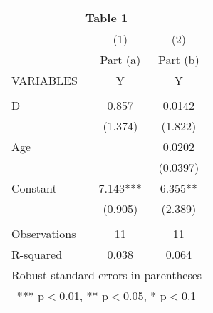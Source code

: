 \documentclass[]{article}
\begin{document}
\begin{tabular}{lcc}
\multicolumn{3}{c}{Table 1} \\ \hline
 & (1) & (2) \\
 & Part (a) & Part (b) \\
VARIABLES & Y & Y \\ \hline
 &  &  \\
D & 0.857 & 0.0142 \\
 & (1.374) & (1.822) \\
Age &  & 0.0202 \\
 &  & (0.0397) \\
Constant & 7.143*** & 6.355** \\
 & (0.905) & (2.389) \\
 &  &  \\
Observations & 11 & 11 \\
 R-squared & 0.038 & 0.064 \\ \hline
\multicolumn{3}{c}{ Robust standard errors in parentheses} \\
\multicolumn{3}{c}{ *** p$<$0.01, ** p$<$0.05, * p$<$0.1} \\
\end{tabular}
\end{document}
